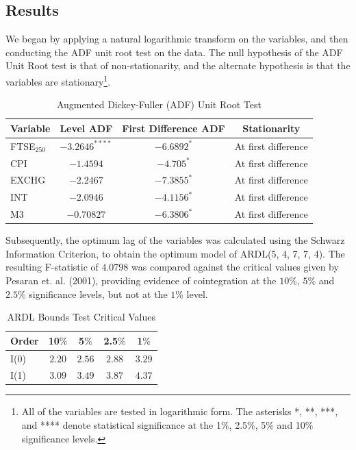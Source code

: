\documentclass[12pt,a4paper]{article}
\begin{document}
\subsection{Results}

We began by applying a natural logarithmic transform on the variables, and 
then conducting the ADF unit root test on the data. The null hypothesis of the 
ADF Unit Root test is that of non-stationarity, and the alternate hypothesis 
is that the variables are stationary\footnote{All of the variables are tested in logarithmic form. The asterisks *, **, ***, and **** denote statistical significance
at the 1$\%$, 2.5$\%$, 5$\%$ and 10$\%$ significance levels.}.


\begin{table}[h!]
    \centering
    \caption{Augmented Dickey-Fuller (ADF) Unit Root Test}
    \begin{tabular}{lccc}
        \toprule
        \textbf{Variable} & \textbf{Level ADF} & \textbf{First Difference ADF} & \textbf{Stationarity} \\
        \midrule
        FTSE$_{250}$ & $-3.2646^{****}$ & $-6.6892^{*}$ & At first difference \\
        CPI          & $-1.4594$ & $-4.705^{*}$ & At first difference \\
        EXCHG        & $-2.2467$ & $-7.3855^{*}$ & At first difference \\
        INT          & $-2.0946$ & $-4.1156^{*}$ & At first difference \\
        M3           & $-0.70827$ & $-6.3806^{*}$ & At first difference \\
        \bottomrule
    \end{tabular}
\end{table}


Subsequently, the optimum lag of the variables was calculated using the 
Schwarz Information Criterion, to obtain the optimum model 
of ARDL(5, 4, 7, 7, 4). The resulting F-statistic of $4.0798$ was compared against the critical values
given by Pesaran et. al. (2001), providing evidence of cointegration 
at the $10\%$, $5\%$ and $2.5\%$ significance levels, but not at the $1\%$ 
level.

\begin{table}[h!]
    \centering
    \caption{ARDL Bounds Test Critical Values}
    \begin{tabular}{lcccc}
        \toprule
        \textbf{Order} & \textbf{10$\%$} & \textbf{5$\%$} & \textbf{2.5$\%$} & \textbf{1$\%$} \\
        \midrule
        I(0) & $2.20$ & $2.56$ & $2.88$ & $3.29$ \\
        I(1) & $3.09$ & $3.49$ & $3.87$  & $4.37$ \\
        \bottomrule
    \end{tabular}
\end{table}
\end{document}

